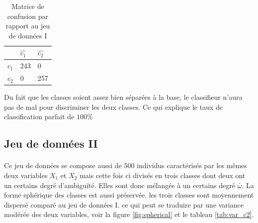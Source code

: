 	\begin{table}[H]
		\centering
		\begin{tabular}{|l|l|l|}
			\hline
			\textbf{}   & \textbf{$\hat{c_1}$} & \textbf{$\hat{c_2}$} \\ \hline
			\textbf{$c_1$} & 243         & 0           \\ \hline
			\textbf{$c_2$} & 0           & 257         \\ \hline
		\end{tabular}
		\caption{Matrice de confusion par rapport au jeu de données I}
	\end{table}
	\par
	Du fait que les classes soient assez bien séparées à la base, le classifieur n'aura pas de mal pour discriminer les deux classes. Ce qui explique le taux de classification parfait de $100\%$
	
\subsection{Jeu de données II}
	\paragraph{}
	Ce jeu de données se compose aussi de $500$ individus caractérisés par les mêmes deux variables $X_1$ et $X_2$ mais cette fois ci divisés en trois classes dont deux ont un certains degré d'ambiguïté. Elles sont donc mélangée à un certains degré $\bar{\omega}$. La forme sphérique des classes est aussi préservée. les trois classes sont moyennement dispersé comparé au jeu de données I. ce qui peut se traduire par une variance modérée des deux variables, voir la figure \ref{fig:spherical} et le tableau \ref{tab:var_c2}.
	
	
	
